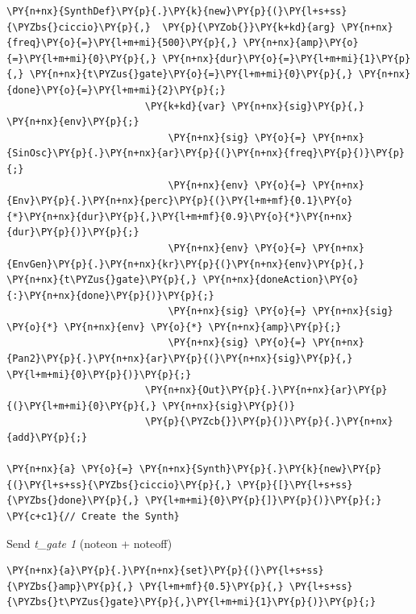     \begin{tcolorbox}[breakable, size=fbox, boxrule=1pt, pad at break*=1mm,colback=cellbackground, colframe=cellborder]
\begin{Verbatim}[commandchars=\\\{\}]
\PY{n+nx}{SynthDef}\PY{p}{.}\PY{k}{new}\PY{p}{(}\PY{l+s+ss}{\PYZbs{}ciccio}\PY{p}{,}  \PY{p}{\PYZob{}}\PY{k+kd}{arg} \PY{n+nx}{freq}\PY{o}{=}\PY{l+m+mi}{500}\PY{p}{,} \PY{n+nx}{amp}\PY{o}{=}\PY{l+m+mi}{0}\PY{p}{,} \PY{n+nx}{dur}\PY{o}{=}\PY{l+m+mi}{1}\PY{p}{,} \PY{n+nx}{t\PYZus{}gate}\PY{o}{=}\PY{l+m+mi}{0}\PY{p}{,} \PY{n+nx}{done}\PY{o}{=}\PY{l+m+mi}{2}\PY{p}{;} 
                        \PY{k+kd}{var} \PY{n+nx}{sig}\PY{p}{,} \PY{n+nx}{env}\PY{p}{;}
                            \PY{n+nx}{sig} \PY{o}{=} \PY{n+nx}{SinOsc}\PY{p}{.}\PY{n+nx}{ar}\PY{p}{(}\PY{n+nx}{freq}\PY{p}{)}\PY{p}{;}
                            \PY{n+nx}{env} \PY{o}{=} \PY{n+nx}{Env}\PY{p}{.}\PY{n+nx}{perc}\PY{p}{(}\PY{l+m+mf}{0.1}\PY{o}{*}\PY{n+nx}{dur}\PY{p}{,}\PY{l+m+mf}{0.9}\PY{o}{*}\PY{n+nx}{dur}\PY{p}{)}\PY{p}{;}                     
                            \PY{n+nx}{env} \PY{o}{=} \PY{n+nx}{EnvGen}\PY{p}{.}\PY{n+nx}{kr}\PY{p}{(}\PY{n+nx}{env}\PY{p}{,} \PY{n+nx}{t\PYZus{}gate}\PY{p}{,} \PY{n+nx}{doneAction}\PY{o}{:}\PY{n+nx}{done}\PY{p}{)}\PY{p}{;}
                            \PY{n+nx}{sig} \PY{o}{=} \PY{n+nx}{sig} \PY{o}{*} \PY{n+nx}{env} \PY{o}{*} \PY{n+nx}{amp}\PY{p}{;}
                            \PY{n+nx}{sig} \PY{o}{=} \PY{n+nx}{Pan2}\PY{p}{.}\PY{n+nx}{ar}\PY{p}{(}\PY{n+nx}{sig}\PY{p}{,} \PY{l+m+mi}{0}\PY{p}{)}\PY{p}{;}
                        \PY{n+nx}{Out}\PY{p}{.}\PY{n+nx}{ar}\PY{p}{(}\PY{l+m+mi}{0}\PY{p}{,} \PY{n+nx}{sig}\PY{p}{)}
                        \PY{p}{\PYZcb{}}\PY{p}{)}\PY{p}{.}\PY{n+nx}{add}\PY{p}{;}                                         

\PY{n+nx}{a} \PY{o}{=} \PY{n+nx}{Synth}\PY{p}{.}\PY{k}{new}\PY{p}{(}\PY{l+s+ss}{\PYZbs{}ciccio}\PY{p}{,} \PY{p}{[}\PY{l+s+ss}{\PYZbs{}done}\PY{p}{,} \PY{l+m+mi}{0}\PY{p}{]}\PY{p}{)}\PY{p}{;}    \PY{c+c1}{// Create the Synth}
\end{Verbatim}
\end{tcolorbox}

Send \textit{t\_gate 1} (noteon + noteoff)

    \begin{tcolorbox}[breakable, size=fbox, boxrule=1pt, pad at break*=1mm,colback=cellbackground, colframe=cellborder]
\begin{Verbatim}[commandchars=\\\{\}]
\PY{n+nx}{a}\PY{p}{.}\PY{n+nx}{set}\PY{p}{(}\PY{l+s+ss}{\PYZbs{}amp}\PY{p}{,} \PY{l+m+mf}{0.5}\PY{p}{,} \PY{l+s+ss}{\PYZbs{}t\PYZus{}gate}\PY{p}{,}\PY{l+m+mi}{1}\PY{p}{)}\PY{p}{;}
\end{Verbatim}
\end{tcolorbox}

